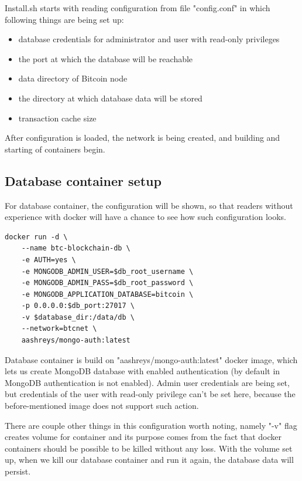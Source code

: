 \documentclass[12pt, en, eng, oneside, final]{mgr}
\begin{document}
Install.sh starts with reading configuration from file "config.conf" in which following things are being set up:

\begin{itemize}
\item
database credentials for administrator and user with read-only privileges
\item
the port at which the database will be reachable
\item
data directory of Bitcoin node
\item
the directory at which database data will be stored
\item
transaction cache size
\end{itemize} 

After configuration is loaded, the network is being created, and building and starting of containers begin.

\subsection{Database container setup}
For database container, the configuration will be shown, so that readers without experience with docker will have a chance to see how such configuration looks.

\begin{lstlisting}[caption=Database container run command]
docker run -d \
    --name btc-blockchain-db \
    -e AUTH=yes \
    -e MONGODB_ADMIN_USER=$db_root_username \
    -e MONGODB_ADMIN_PASS=$db_root_password \
    -e MONGODB_APPLICATION_DATABASE=bitcoin \
    -p 0.0.0.0:$db_port:27017 \
    -v $database_dir:/data/db \
    --network=btcnet \
    aashreys/mongo-auth:latest
\end{lstlisting}

Database container is build on "aashreys/mongo-auth:latest" \cite{mongo-auth} docker image, which lets us create MongoDB database with enabled authentication (by default in MongoDB authentication is not enabled).
Admin user credentials are being set, but credentials of the user with read-only privilege can't be set here, because the before-mentioned image does not support such action.

There are couple other things in this configuration worth noting, namely "-v" flag creates volume for container and its purpose comes from the fact that docker containers should be possible to be killed without any loss. With the volume set up, when we kill our database container and run it again, the database data will persist.
\end{document}

